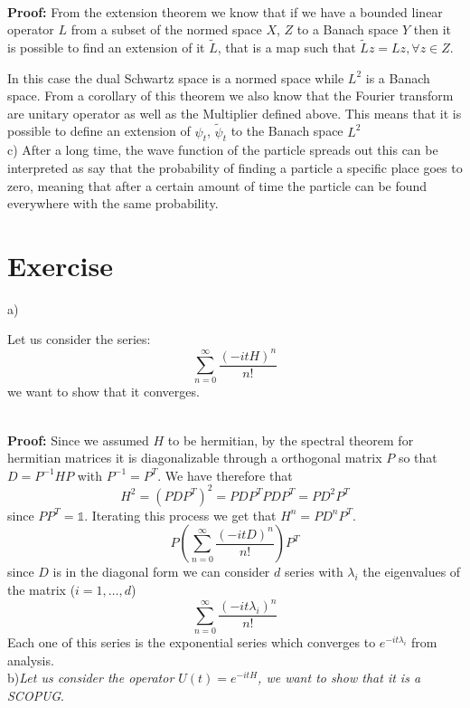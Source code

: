 \documentclass{article}
\newcommand{\ex}{\textit}
\newcommand{\proof}{\\ \textbf{Proof: }}
\begin{document}
\proof From the extension theorem we know that if we have a bounded linear operator $ L$ from a subset of the normed space $X$, $Z$ to a Banach space $Y$ then it is possible to find an extension of it $\tilde L$, that is a map such that $\tilde L z = L z, \forall z \in Z$. 

In this case the dual Schwartz space is a normed space while $L^2$ is a Banach space. From a corollary of this theorem we also know that the Fourier transform are unitary operator as well as the Multiplier defined above. This means that it is possible to define an extension of $\psi_t$, $\tilde \psi_t$ to the Banach space $L^2$ \\
c) After a long time, the wave function of the particle spreads out this can be interpreted as say that the probability of finding a particle a specific place goes to zero, meaning that after a certain amount of time the particle can be found everywhere with the same probability.
\section{Exercise}
a)
\begin{em}
    Let us consider the series:
    \[
        \sum_{n=0}^\infty \frac{(-i t H)^n}{n!} 
    \]
    we want to show that it converges.
\end{em}

\proof Since we assumed $H$ to be hermitian, by the spectral theorem for hermitian matrices it is diagonalizable through a orthogonal matrix $P$ so that $D = P^{-1} H P$ with $P^{-1} = P^T$. We have therefore that
\[
    H^2 = (P D P^T)^2 = P D P^TP D P^T = P D^2 P^T
\]
since $PP^T = \mathds{1}$. Iterating this process we get that $H^n = P D^n P^T$.
\[
    P\left(\sum_{n=0}^\infty \frac{(-i t D)^n}{n!}\right)P^T
\]
since $D$ is in the diagonal form we can consider $d$ series with $\lambda_i$ the eigenvalues of the matrix ($i = 1, \dots, d$)
\[
    \sum_{n=0}^\infty \frac{(-i t \lambda_i)^n}{n!}
\]
Each one of this series is the exponential series which converges to $e^{-it\lambda_i}$ from analysis.
\\
b)\ex{Let us consider the operator $U(t) = e^{-itH}$, we want to show that it is a SCOPUG}.
\end{document}
